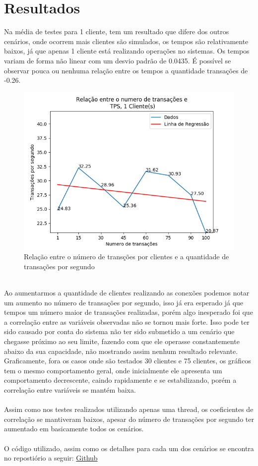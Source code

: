 \documentclass[12pt, a4paper, twoside, titlepage]{article}
\begin{document}
\section{Resultados}
Na média de testes para 1 cliente, tem um resultado que difere dos outros cenários, onde ocorrem mais clientes são simulados, os tempos são relativamente baixos, já que apenas 1 cliente está realizando operações no sistemas. Os tempos variam de forma não linear com um desvio padrão de 0.0435. É possível se observar pouca ou nenhuma relação entre os tempos a quantidade transações de -0.26.
\begin{figure}[!htb]
	\includegraphics[width=\textwidth]{imgs/1_client.png}
	\caption{Relação entre o número de transções por clientes e a quantidade de transações por segundo}
\end{figure}

\\Ao aumentarmos a quantidade de clientes realizando as conexões podemos notar um aumento no número de transações por segundo, isso já era esperado já que tempos um número maior de transações realizadas, porém algo inesperado foi que a correlação entre as variáveis observadas não se tornou mais forte. Isso pode ter sido causado por conta do sistema não ter sido submetido a um cenário que chegasse próximo ao seu limite, fazendo com que ele operasse constantemente abaixo da sua capacidade, não mostrando assim nenhum resultado relevante.
\\Graficamente, fora os casos onde são testados 30 clientes e 75 clientes, os gráficos tem o mesmo comportamento geral, onde inicialmente ele apresenta um comportamento decrescente, caindo rapidamente e se estabilizando, porém a correlação entre variáveis se mantém baixa.
\\\\Assim como nos testes realizados utilizando apenas uma thread, os coeficientes de correlação se mantiveram baixos, apesar do número de transações por segundo ter aumentado em basicamente todos os cenários.
\\\\O código utilizado, assim como os detalhes para cada um dos cenários se encontra no repostiório a seguir: \href{https://github.com/reisnobre/db_2_benchmark}{Github} 
\end{document}
